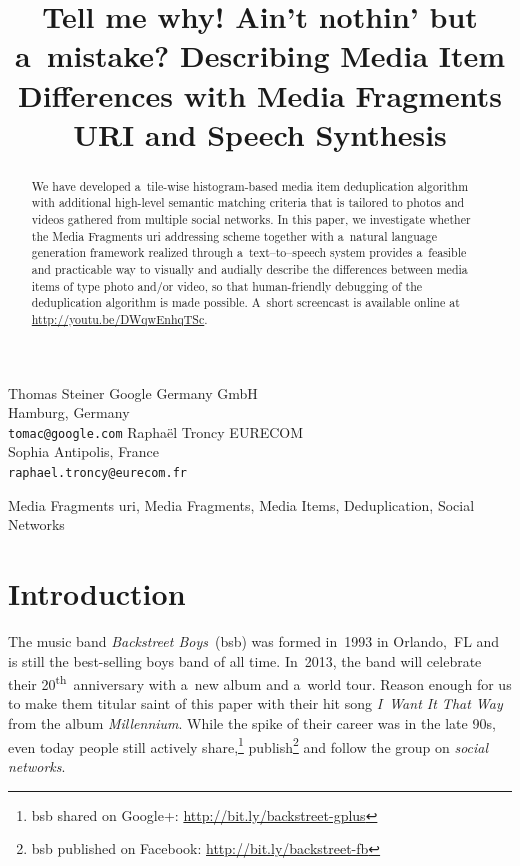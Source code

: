 \documentclass{article}
\begin{document}
\sloppy

\newcommand{\ts}{\textsuperscript}

\title{Tell me why! Ain't nothin' but a~mistake? Describing Media Item Differences with Media Fragments URI and Speech Synthesis}

\twoauthors
  {Thomas Steiner}
	{Google Germany GmbH\\
	Hamburg, Germany\\
    \texttt{tomac@google.com}}
  {Raphaël Troncy}
	{EURECOM\\
    Sophia Antipolis, France\\
	\texttt{raphael.troncy@eurecom.fr}}

\maketitle


\begin{abstract}
We have developed a~tile-wise histogram-based media item deduplication algorithm with additional high-level semantic matching criteria that is tailored to photos and videos gathered from multiple social networks. In this paper, we investigate whether the Media Fragments {\sc uri} addressing scheme together with a~natural language generation framework realized through a~text--to--speech system provides a~feasible and practicable way to visually and audially describe the differences between media items of type photo and/or video, so that human-friendly debugging of the deduplication algorithm is made possible. A~short screencast is available online at \url{http://youtu.be/DWqwEnhqTSc}.
\end{abstract}

\begin{keywords}
Media Fragments {\sc uri}, Media Fragments, Media Items, Deduplication, Social Networks
\end{keywords}


\section{Introduction}
\label{sec:introduction}
The music band \emph{Backstreet Boys}~({\sc bsb}) was formed in~1993 in Orlando,~FL and is still the best-selling boys band of all time. In~2013, the band will celebrate their 20\ts{th}~anniversary with a~new album and a~world tour. Reason enough for us to make them titular saint of this paper with their hit song \emph{I~Want It That Way} from the album \emph{Millennium}. While the spike of their career was in the late 90s, even today people still actively share,\footnote{{\sc bsb} shared on Google+: \url{http://bit.ly/backstreet-gplus}} publish\footnote{{\sc bsb} published on Facebook: \url{http://bit.ly/backstreet-fb}} and follow the group on \emph{social networks}.
\end{document}
